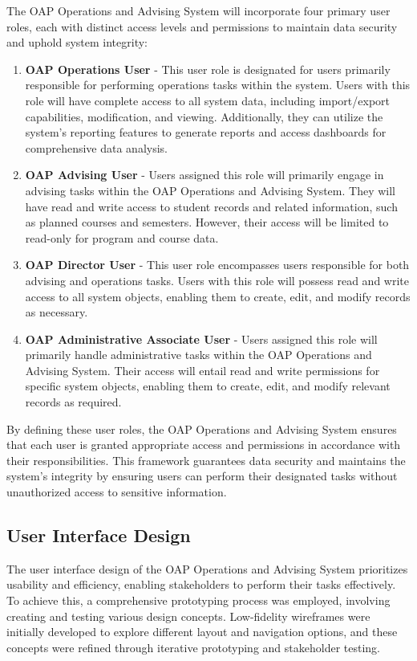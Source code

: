 \documentclass[12pt]{article}
\begin{document}
The OAP Operations and Advising System will incorporate four primary user roles, each with distinct access levels and permissions to maintain data security and uphold system integrity:

\begin{enumerate}[label=(\roman*)] 
    \item \textbf{OAP Operations User} - This user role is designated for users primarily responsible for performing operations tasks within the system. Users with this role will have complete access to all system data, including import/export capabilities, modification, and viewing. Additionally, they can utilize the system's reporting features to generate reports and access dashboards for comprehensive data analysis. 
    \item \textbf{OAP Advising User} - Users assigned this role will primarily engage in advising tasks within the OAP Operations and Advising System. They will have read and write access to student records and related information, such as planned courses and semesters. However, their access will be limited to read-only for program and course data. 
    \item \textbf{OAP Director User} - This user role encompasses users responsible for both advising and operations tasks. Users with this role will possess read and write access to all system objects, enabling them to create, edit, and modify records as necessary. 
    \item \textbf{OAP Administrative Associate User} - Users assigned this role will primarily handle administrative tasks within the OAP Operations and Advising System. Their access will entail read and write permissions for specific system objects, enabling them to create, edit, and modify relevant records as required. 
\end{enumerate}

By defining these user roles, the OAP Operations and Advising System ensures that each user is granted appropriate access and permissions in accordance with their responsibilities. This framework guarantees data security and maintains the system's integrity by ensuring users can perform their designated tasks without unauthorized access to sensitive information.

\subsection{User Interface Design} 
The user interface design of the OAP Operations and Advising System prioritizes usability and efficiency, enabling stakeholders to perform their tasks effectively. To achieve this, a comprehensive prototyping process was employed, involving creating and testing various design concepts. Low-fidelity wireframes were initially developed to explore different layout and navigation options, and these concepts were refined through iterative prototyping and stakeholder testing.
\end{document}
